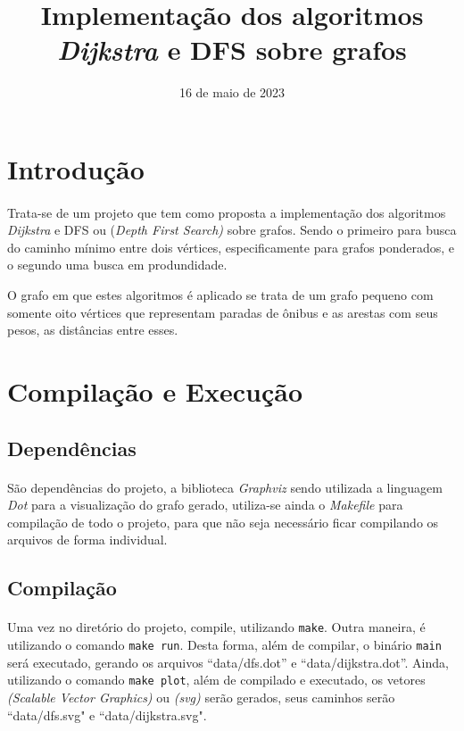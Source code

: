 \documentclass{article}
\title{Implementação dos algoritmos {\it Dijkstra\/} e DFS sobre grafos}
\author{\sc{Paulo Ricardo \& Vinícios Bidin}}
\date{16 de maio de 2023}
\begin{document}
    \maketitle
	\tableofcontents

    \section{Introdução}
        \paragraph{} Trata-se de um projeto que tem como proposta a implementação dos algoritmos {\it Dijkstra} e DFS ou {(\it Depth First Search)} sobre grafos. Sendo o primeiro para busca do caminho mínimo entre dois vértices, especificamente para grafos ponderados, e o segundo uma busca em produndidade.
		\par O grafo em que estes algoritmos é aplicado se trata de um grafo pequeno com somente oito vértices que representam paradas de ônibus e as arestas com seus pesos, as distâncias entre esses.

		\section{Compilação e Execução}
			\subsection{Dependências}
				\paragraph{} São dependências do projeto, a biblioteca {\it Graphviz} sendo utilizada a linguagem {\it Dot} para a visualização do grafo gerado, utiliza-se ainda o {\it Makefile} para compilação de todo o projeto, para que não seja necessário ficar compilando os arquivos de forma individual.

			\subsection{Compilação}
				\paragraph{} Uma vez no diretório do projeto, compile, utilizando \texttt{make}.
				Outra maneira, é utilizando o comando \texttt{make run}. Desta forma, além de compilar, o binário \texttt{main} será executado, gerando os arquivos ``data/dfs.dot'' e ``data/dijkstra.dot''.
				Ainda, utilizando o comando \texttt{make plot}, além de compilado e executado, os vetores {\it (Scalable Vector Graphics)} ou {\it (svg)} serão gerados, seus caminhos serão ``data/dfs.svg" e ``data/dijkstra.svg".
\end{document}
